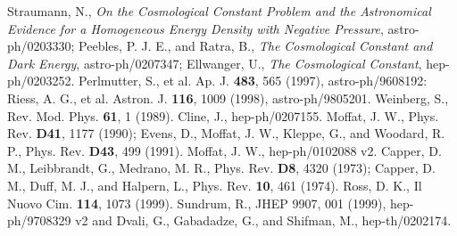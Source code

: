 \documentclass[a4paper,12pt]{article}
\begin{document}
\begin{thebibliography}{100}

 Straumann, N., {\it On the Cosmological Constant
Problem and the Astronomical Evidence for a Homogeneous Energy Density with
Negative Pressure}, astro-ph/0203330; Peebles, P. J. E., and Ratra, B.,
{\it The Cosmological Constant and Dark Energy}, astro-ph/0207347;
Ellwanger, U., {\it The Cosmological Constant}, hep-ph/0203252.
 Perlmutter, S., et al. Ap. J. {\bf 483}, 565 (1997),
astro-ph/9608192: Riess, A. G., et al. Astron. J. {\bf 116}, 1009 (1998),
astro-ph/9805201.
 Weinberg, S., Rev. Mod. Phys. {\bf
61}, 1 (1989).
 Cline, J., hep-ph/0207155.
 Moffat, J. W., Phys. Rev. {\bf D41}, 1177 (1990); Evens,
D., Moffat, J. W., Kleppe, G., and Woodard, R. P., Phys. Rev. {\bf D43},
499 (1991).
 Moffat, J. W., hep-ph/0102088 v2.
 Capper, D. M., Leibbrandt, G., Medrano, M. R., Phys.
Rev. {\bf D8}, 4320 (1973); Capper, D. M., Duff, M. J., and Halpern, L.,
Phys. Rev. {\bf 10}, 461 (1974).
 Ross, D. K., Il Nuovo
Cim. {\bf 114}, 1073 (1999).
 Sundrum, R., JHEP 9907, 001
(1999), hep-ph/9708329 v2 and Dvali, G., Gabadadze, G., and Shifman, M.,
hep-th/0202174.

\end{thebibliography}
\end{document}
